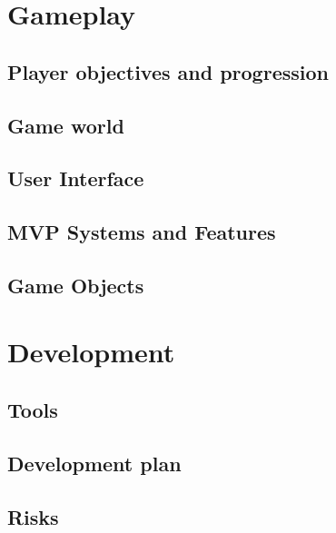 \documentclass{article}
\begin{document}
\section{Gameplay}


\subsection{Player objectives and progression}



\subsection{Game world}



\subsection{User Interface}



\subsection{MVP Systems and Features}




\subsection{Game Objects}



\section{Development}

\subsection{Tools}



\subsection{Development plan}



\subsection{Risks}
\end{document}
